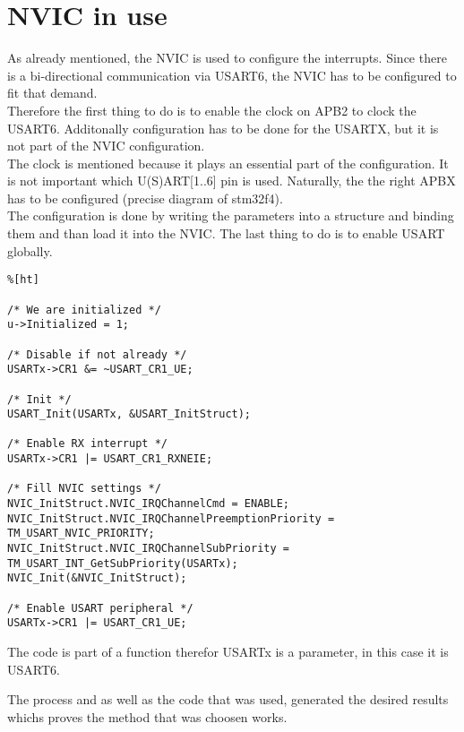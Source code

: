\chapter{NVIC in use}
As already mentioned, the NVIC is used to configure the interrupts. Since
there is a bi-directional communication via USART6, the NVIC has to be
configured to fit that demand.\\
Therefore the first thing to do is to enable the clock on APB2 to clock
the USART6. Additonally configuration has to be done for the USARTX,
 but it is not part of the NVIC configuration.\\
The clock is mentioned because it plays an essential part of the configuration. 
It is not important which U(S)ART[1..6] pin is used. Naturally, the the right APBX 
has to be configured (precise diagram of stm32f4).\\
The configuration is done by writing the parameters into a structure and
binding them and than load it into the NVIC.
The last thing to do is to enable USART globally.

\begin{lstlisting}%[ht]

/* We are initialized */
u->Initialized = 1;

/* Disable if not already */
USARTx->CR1 &= ~USART_CR1_UE;

/* Init */
USART_Init(USARTx, &USART_InitStruct);

/* Enable RX interrupt */
USARTx->CR1 |= USART_CR1_RXNEIE;

/* Fill NVIC settings */
NVIC_InitStruct.NVIC_IRQChannelCmd = ENABLE;
NVIC_InitStruct.NVIC_IRQChannelPreemptionPriority = TM_USART_NVIC_PRIORITY;
NVIC_InitStruct.NVIC_IRQChannelSubPriority = TM_USART_INT_GetSubPriority(USARTx);
NVIC_Init(&NVIC_InitStruct);

/* Enable USART peripheral */
USARTx->CR1 |= USART_CR1_UE;
\end{lstlisting}

The code is part of a function therefor USARTx is a parameter, in this case it
is USART6.

The process and as well as the code that was used, generated the desired results whichs 
proves the method that was choosen works.


